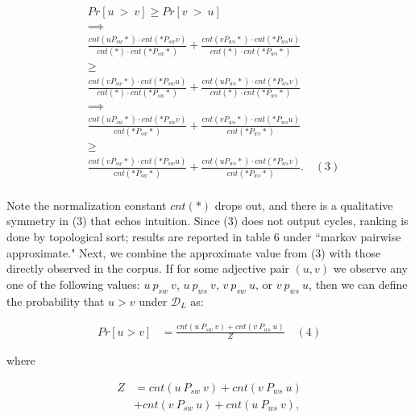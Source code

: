 \begin{align*}
  &Pr[u \: > \: v] \ge Pr[v \: > \: u] \\
  &\implies \\
  &\frac{ cnt(u P_{sw} *) \cdot cnt(* P_{sw} v) }{ cnt(*) \cdot cnt(* P_{sw} *)} 
  + \frac{ cnt(v P_{ws} *) \cdot cnt(* P_{ws} u) }{ cnt(*) \cdot cnt(* P_{ws} *)} \\
  &\ge\\
  &\frac{ cnt(v P_{sw} *) \cdot cnt(* P_{sw} u) }{ cnt(*) \cdot cnt(* P_{sw} *)} 
  + \frac{ cnt(u P_{ws} *) \cdot cnt(* P_{ws} v) }{ cnt(*) \cdot cnt(* P_{ws} *)} \\
  &\implies\\
  &\frac{ cnt(u P_{sw} *) \cdot cnt(* P_{sw} v) }{ cnt(* P_{sw} *)} 
  + \frac{ cnt(v P_{ws} *) \cdot cnt(* P_{ws} u) }{ cnt(* P_{ws} *)} \\
  &\ge\\
  &\frac{ cnt(v P_{sw} *) \cdot cnt(* P_{sw} u) }{ cnt(* P_{sw} *)} 
  + \frac{ cnt(u P_{ws} *) \cdot cnt(* P_{ws} v) }{ cnt(* P_{ws} *)}. \quad (3) \\
\end{align*}

Note the normalization constant $cnt(*)$ drops out, and there is a qualitative symmetry in (3) that echos intuition. Since (3) does not output cycles, ranking is done by topological sort; results are reported in table 6 under ``markov pairwise approximate."  Next, we combine the approximate value from (3) with those directly observed in the corpus. If for some adjective pair $(u,v)$ we observe any one of the following values: $u \: p_{sw} \: v$, $u \: p_{ws} \: v$, $v \: p_{sw} \: u$, or $v \: p_{ws} \: u$, then we can define the probability that $u > v$ under $\mathcal{D}_L$ as:

\begin{align*}
Pr[u > v] &= \frac{cnt(u \: P_{sw} \: v) + cnt(v \: P_{ws} \: u)}{Z} \quad (4)
\end{align*}

where 

\begin{align*}
Z &= cnt(u \: P_{sw} \: v) + cnt(v \: P_{ws} \: u)\\
  &+ cnt(v \: P_{sw} \: u) + cnt(u \: P_{ws} \: v),
\end{align*}


